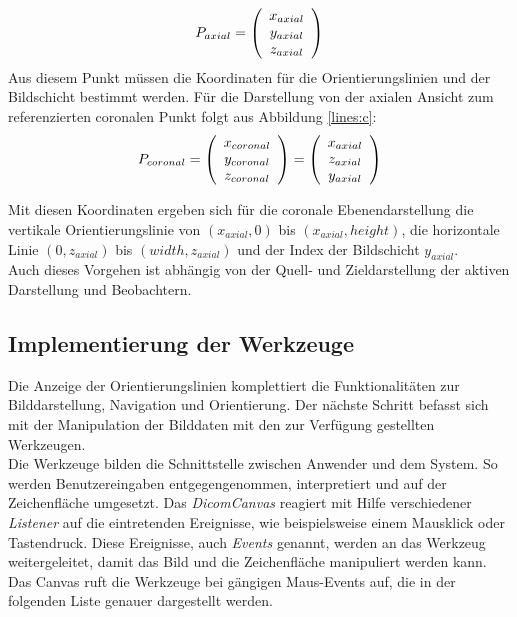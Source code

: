 \begin{equation}
P_{axial}=\left(\begin{array}{c} x_{axial} \\ y_{axial} \\ z_{axial} \end{array}\right) 
\vspace{0.5cm}
\end{equation}
Aus diesem Punkt müssen die Koordinaten für die Orientierungslinien und der Bildschicht bestimmt werden.
Für die Darstellung von der axialen Ansicht zum referenzierten coronalen Punkt folgt aus Abbildung \ref{lines:c}:
\begin{equation}
P_{coronal}=\left(\begin{array}{c} x_{coronal} \\ y_{coronal} \\ z_{coronal} \end{array}\right) =
\left(\begin{array}{c} x_{axial} \\ z_{axial} \\ y_{axial} \end{array}\right)
\vspace{0.5cm}
\end{equation}

Mit diesen Koordinaten ergeben sich für die coronale Ebenendarstellung die vertikale Orientierungslinie von $(x_{axial}, 0)$ bis $(x_{axial}, height)$, die horizontale Linie $(0, z_{axial})$ bis $(width, z_{axial})$ und der Index der Bildschicht $y_{axial}$.\\
Auch dieses Vorgehen ist abhängig von der Quell- und Zieldarstellung der aktiven Darstellung und Beobachtern.

\subsection{Implementierung der Werkzeuge}

Die Anzeige der Orientierungslinien komplettiert die Funktionalitäten zur Bilddarstellung, Navigation und Orientierung. Der nächste Schritt befasst sich mit der Manipulation der Bilddaten mit den zur Verfügung gestellten Werkzeugen.\\
Die Werkzeuge bilden die Schnittstelle zwischen Anwender und dem System. So werden Benutzereingaben entgegengenommen, interpretiert und auf der Zeichenfläche umgesetzt. Das \textit{DicomCanvas} reagiert mit Hilfe verschiedener \textit{Listener} auf die eintretenden Ereignisse, wie beispielsweise einem Mausklick oder Tastendruck. Diese Ereignisse, auch \textit{Events} genannt, werden an das Werkzeug weitergeleitet, damit das Bild und die Zeichenfläche manipuliert werden kann. Das Canvas ruft die Werkzeuge bei gängigen Maus-Events auf, die in der folgenden Liste genauer dargestellt werden.

